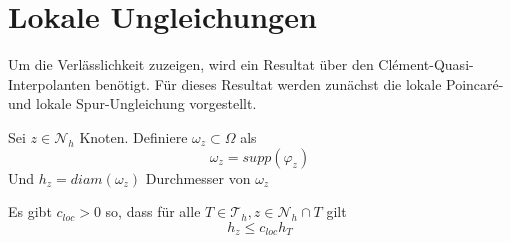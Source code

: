 \section{Lokale Ungleichungen}
Um die Verlässlichkeit zuzeigen, wird ein Resultat über den Clément-Quasi-Interpolanten benötigt. Für dieses Resultat werden zunächst die lokale Poincaré- und lokale Spur-Ungleichung vorgestellt.
\begin{definition}
	Sei $z \in \mathscr{N}_h$ Knoten. Definiere $\omega_z \subset \Omega$ als
	\[
	\omega_z = supp(\varphi_z)
	\]
	Und $h_z = diam(\omega_z)$ Durchmesser von $\omega_z$
\end{definition}
\begin{bemerkung}
	Es gibt $c_{loc} > 0$ so, dass für alle $T \in\mathscr{T}_h, z\in\mathscr{N}_h\cap T$ gilt
	\[
	h_z\leq c_{loc}h_T
	\]
\end{bemerkung}

